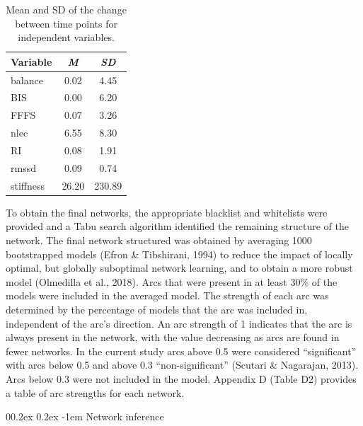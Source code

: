 \documentclass[
  english,
  man,floatsintext]{apa6}
\makeatletter
\renewcommand{\paragraph}{\@startsection{paragraph}{4}{\parindent}%
  {0\baselineskip \@plus 0.2ex \@minus 0.2ex}%
  {-1em}%
  {\normalfont\normalsize\bfseries\itshape\typesectitle}}
\makeatother
\begin{document}
\begin{table}[H]

\begin{center}
\begin{threeparttable}

\caption{\label{tab:secondnetwork}Mean and SD of the change between time points for independent variables.}

\begin{tabular}{lcc}
\toprule
Variable & \textit{M} & \textit{SD}\\
\midrule
balance & 0.02 & 4.45\\
BIS & 0.00 & 6.20\\
FFFS & 0.07 & 3.26\\
nlec & 6.55 & 8.30\\
RI & 0.08 & 1.91\\
rmssd & 0.09 & 0.74\\
stiffness & 26.20 & 230.89\\
\bottomrule
\end{tabular}

\end{threeparttable}
\end{center}

\end{table}

To obtain the final networks, the appropriate blacklist and whitelists were provided and a Tabu search algorithm identified the remaining structure of the network.
The final network structured was obtained by averaging 1000 bootstrapped models (Efron \& Tibshirani, 1994) to reduce the impact of locally optimal, but globally suboptimal network learning, and to obtain a more robust model (Olmedilla et al., 2018).
Arcs that were present in at least 30\% of the models were included in the averaged model.
The strength of each arc was determined by the percentage of models that the arc was included in, independent of the arc's direction.
An arc strength of 1 indicates that the arc is always present in the network, with the value decreasing as arcs are found in fewer networks.
In the current study arcs above 0.5 were considered \enquote{significant} with arcs below 0.5 and above 0.3 \enquote{non-significant} (Scutari \& Nagarajan, 2013).
Arcs below 0.3 were not included in the model.
Appendix D (Table D2) provides a table of arc strengths for each network.

\hypertarget{network-inference}{%
\paragraph{Network inference}\label{network-inference}}
\end{document}
